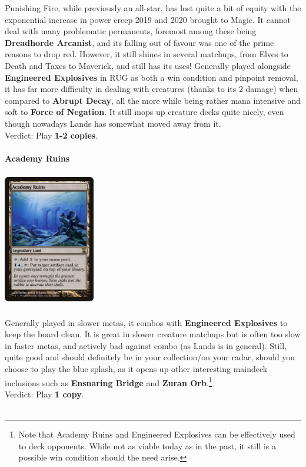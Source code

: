 \documentclass{report}
\begin{document}
Punishing Fire, while previously an all-star, has lost quite a bit of equity with the exponential increase in power creep 2019 and 2020 brought to Magic. It cannot deal with many problematic permanents, foremost among these being \textbf{Dreadhorde Arcanist}, and its falling out of favour was one of the prime reasons to drop red. However, it still shines in several matchups, from Elves to Death and Taxes to Maverick, and still has its uses! Generally played alongside \textbf{Engineered Explosives} in RUG as both a win condition and pinpoint removal, it has far more difficulty in dealing with creatures (thanks to its 2 damage) when compared to \textbf{Abrupt Decay}, all the more while being rather mana intensive and soft to \textbf{Force of Negation}. It still mops up creature decks quite nicely, even though nowadays Lands has somewhat moved away from it.\\
Verdict: Play \textbf{1-2 copies}.\\\\
\textbf{Academy Ruins}
\begin{center}
\includegraphics [width = 4cm, height = 6cm] {academy-ruins}
\end{center}
Generally played in slower metas, it combos with \textbf{Engineered Explosives} to keep the board clean. It is great in slower creature matchups but is often too slow in faster metas, and actively bad against combo (as Lands is in general). Still, quite good and should definitely be in your collection/on your radar, should you choose to play the blue splash, as it opens up other interesting maindeck inclusions such as \textbf{Ensnaring Bridge} and \textbf{Zuran Orb}.\footnote{Note that Academy Ruins and Engineered Explosives can be effectively used to deck opponents. While not as viable today as in the past, it still is a possible win condition should the need arise.}\\
Verdict: Play \textbf{1 copy}.\\\\
\end{document}
